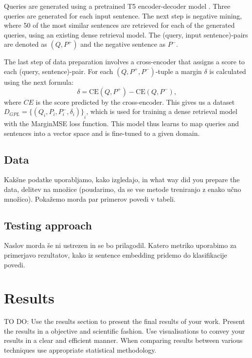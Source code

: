 \documentclass[fleqn,moreauthors,10pt]{ds_report}
\begin{document}
Queries are generated using a pretrained T5 encoder-decoder model \cite{T5}. Three queries are generated for each input sentence. The next step is negative mining, where 50 of the most similar sentences are retrieved for each of the generated queries, using an existing dense retrieval model. The (query, input sentence)-pairs are denoted as $(Q, P^{+})$ and the negative sentence as $P^{-}$.

The last step of data preparation involves a cross-encoder that assigns a score to each (query, sentence)-pair. For each $(Q, P^{+}, P^{-})$-tuple a margin $\delta$ is calculated using the next formula:
\begin{equation}
	\delta = \text{CE}(Q, P^{+}) - \text{CE}(Q, P^{-})\text{,}
\label{eq:delta}
\end{equation}
where $CE$ is the score predicted by the cross-encoder. This gives us a dataset $D_{GPL} = {\{ ( Q_i, P_i, P_i^{-}, \delta_i ) \}}_i$, which is used for training a dense retrieval model with the MarginMSE loss function. This model thus learns to map queries and sentences into a vector space and is fine-tuned to a given domain.


\subsection*{Data}
Kakšne podatke uporabljamo, kako izgledajo, in what way did you prepare the data, delitev na množice (poudarimo, da se vse metode treniranjo z enako učno množico).
Pokažemo morda par primerov povedi v tabeli.


\subsection*{Testing approach}
Naslov morda še ni ustrezen in se bo prilagodil.
Katero metriko uporabimo za primerjavo rezultatov, kako iz sentence embedding pridemo do klasifikacije povedi.




\section*{Results}

TO DO:
Use the results section to present the final results of your work. Present the results in a objective and scientific fashion. Use visualisations to convey your results in a clear and efficient manner. When comparing results between various techniques use appropriate statistical methodology.
\end{document}
